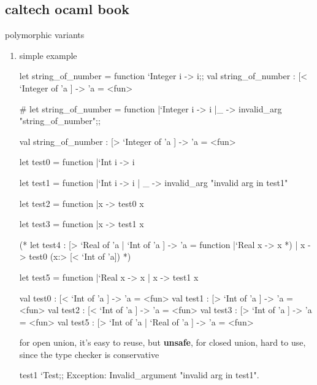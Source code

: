 
\subsection{caltech ocaml book}


  
polymorphic variants
  \begin{enumerate}
  \item simple example

\begin{alternate}
let string_of_number = function `Integer i -> i;;
val string_of_number : [< `Integer of 'a ] -> 'a = <fun>
\end{alternate}
    
\begin{ocamlcode}  
# let string_of_number = function
    |`Integer i -> i
    |_ -> invalid_arg "string_of_number";;
  \end{ocamlcode}
\begin{ocamlcode}  
  val string_of_number : [> `Integer of 'a ] -> 'a = <fun>
\end{ocamlcode}  

\begin{ocamlcode}
let test0 = function 
  |`Int i -> i

let test1 = function 
  |`Int i -> i 
  | _ -> invalid_arg "invalid arg in test1"

let test2 = function 
  |x -> test0 x

let test3 = function 
  |x -> test1 x

(* let test4 : [> `Real of 'a | `Int of 'a ] -> 'a = function 
   |`Real x -> x *)
   | x -> test0 (x:> [< `Int of 'a])  *)

let test5 = function 
  |`Real x -> x 
  | x -> test1 x 
  
\end{ocamlcode}

\begin{ocamlcode}
val test0 : [< `Int of 'a ] -> 'a = <fun>
val test1 : [> `Int of 'a ] -> 'a = <fun>
val test2 : [< `Int of 'a ] -> 'a = <fun>
val test3 : [> `Int of 'a ] -> 'a = <fun>
val test5 : [> `Int of 'a | `Real of 'a ] -> 'a = <fun>
\end{ocamlcode}

for open union, it's easy to reuse, but \textbf{unsafe},
for closed union, hard to use, since the type checker is
conservative


\begin{alternate}

test1 `Test;;
Exception: Invalid_argument "invalid arg in test1".


\end{alternate}
\end{enumerate}
